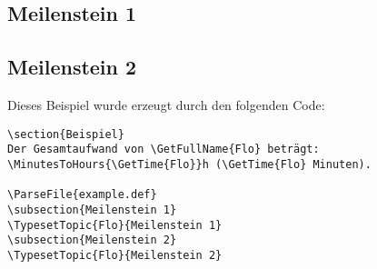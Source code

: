 \documentclass{article}
\begin{document}
\subsection{Meilenstein 1}
\subsection{Meilenstein 2}

Dieses Beispiel wurde erzeugt durch den folgenden Code:
\begin{Verbatim}[commandchars=\&\$\$]
\section{Beispiel}
Der Gesamtaufwand von \GetFullName{Flo} beträgt:
\MinutesToHours{\GetTime{Flo}}h (\GetTime{Flo} Minuten).

\ParseFile{example.def}
\subsection{Meilenstein 1}
\TypesetTopic{Flo}{Meilenstein 1}
\subsection{Meilenstein 2}
\TypesetTopic{Flo}{Meilenstein 2}
\end{Verbatim}

\clearpage\appendix
{}
\printindex
\end{document}
